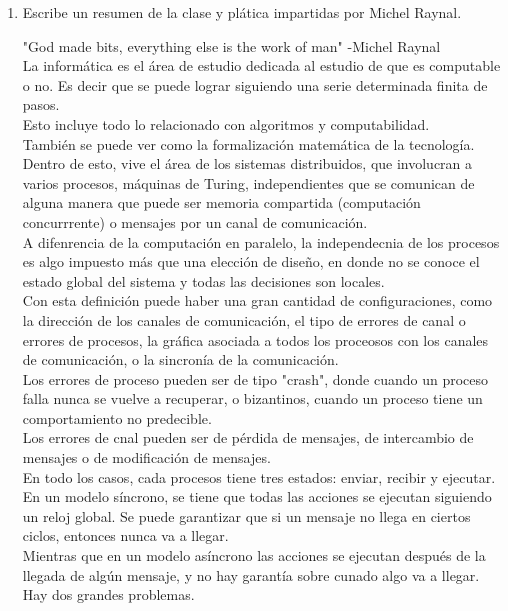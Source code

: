 \documentclass[12pt,a4paper]{report}
\begin{document}
\begin{enumerate}
{	}

	\item{
		Escribe un resumen de la clase y plática impartidas por Michel Raynal.

		"God made bits, everything else is the work of man" -Michel Raynal\\
		La informática es el área de estudio dedicada al estudio de que es computable
		o no. Es decir que se puede lograr siguiendo una serie determinada finita de pasos.\\
		Esto incluye todo lo relacionado con algoritmos y computabilidad.\\
		También se puede ver como la formalización matemática de la tecnología.\\
		Dentro de esto, vive el área de los sistemas distribuidos, que involucran
		a varios procesos, máquinas de Turing, independientes que se comunican de
		alguna manera que puede ser memoria compartida (computación concurrrente)
		o mensajes por un canal de comunicación.\\
		A difenrencia de la computación en paralelo, la independecnia de los procesos
		es algo impuesto más que una elección de diseño, en donde no se conoce el
		estado global del sistema y todas las decisiones son locales.\\
		Con esta definición puede haber una gran cantidad de configuraciones, como
		la dirección de los canales de comunicación, el tipo de errores de canal o errores
		de procesos, la gráfica asociada a todos los proceosos con los canales de comunicación,
		o la sincronía de la comunicación.\\
		Los errores de proceso pueden ser de tipo "crash", donde cuando un proceso
		falla nunca se vuelve a recuperar, o bizantinos, cuando un proceso tiene un
		comportamiento no predecible.\\
		Los errores de cnal pueden ser de pérdida de mensajes, de intercambio de mensajes
		o de modificación de mensajes.\\
		En todo los casos, cada procesos tiene tres estados: enviar, recibir y ejecutar.
		En un modelo síncrono, se tiene que todas las acciones se ejecutan siguiendo
		un reloj global. Se puede garantizar que si un mensaje no llega en ciertos ciclos,
		entonces nunca va a llegar.\\
		Mientras que en un modelo asíncrono las acciones se ejecutan después de la llegada
		de algún mensaje, y no hay garantía sobre cunado algo va a llegar.\\
		Hay dos grandes problemas.\\
}
\end{enumerate}
\end{document}

